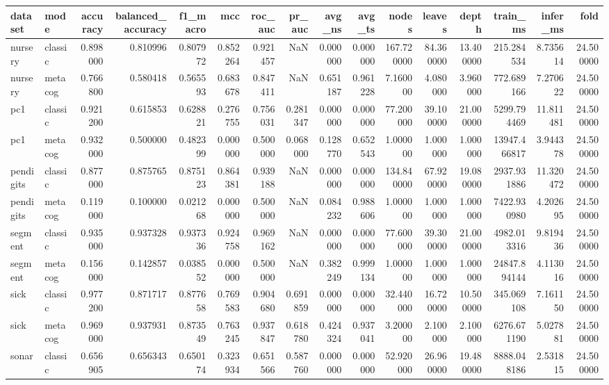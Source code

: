 \begin{tabular}{llrrrrrrrrrrrrrr}
\toprule
dataset & mode & accuracy & balanced_accuracy & f1_macro & mcc & roc_auc & pr_auc & avg_ns & avg_ts & nodes & leaves & depth & train_ms & infer_ms & fold \\
\midrule
nursery & classic & 0.898000 & 0.810996 & 0.807972 & 0.852264 & 0.921457 & NaN & 0.000000 & 0.000000 & 167.720000 & 84.360000 & 13.400000 & 215.284534 & 8.735614 & 24.500000 \\
nursery & metacog & 0.766800 & 0.580418 & 0.565593 & 0.683678 & 0.847411 & NaN & 0.651187 & 0.961228 & 7.160000 & 4.080000 & 3.960000 & 772.689166 & 7.270622 & 24.500000 \\
pc1 & classic & 0.921200 & 0.615853 & 0.628821 & 0.276755 & 0.756031 & 0.281347 & 0.000000 & 0.000000 & 77.200000 & 39.100000 & 21.000000 & 5299.794469 & 11.811481 & 24.500000 \\
pc1 & metacog & 0.932000 & 0.500000 & 0.482399 & 0.000000 & 0.500000 & 0.068000 & 0.128770 & 0.652543 & 1.000000 & 1.000000 & 1.000000 & 13947.466817 & 3.944378 & 24.500000 \\
pendigits & classic & 0.877000 & 0.875765 & 0.875123 & 0.864381 & 0.939188 & NaN & 0.000000 & 0.000000 & 134.840000 & 67.920000 & 19.080000 & 2937.931886 & 11.320472 & 24.500000 \\
pendigits & metacog & 0.119000 & 0.100000 & 0.021268 & 0.000000 & 0.500000 & NaN & 0.084232 & 0.988606 & 1.000000 & 1.000000 & 1.000000 & 7422.930980 & 4.202695 & 24.500000 \\
segment & classic & 0.935000 & 0.937328 & 0.937336 & 0.924758 & 0.969162 & NaN & 0.000000 & 0.000000 & 77.600000 & 39.300000 & 21.000000 & 4982.013316 & 9.819436 & 24.500000 \\
segment & metacog & 0.156000 & 0.142857 & 0.038552 & 0.000000 & 0.500000 & NaN & 0.382249 & 0.999134 & 1.000000 & 1.000000 & 1.000000 & 24847.894144 & 4.113016 & 24.500000 \\
sick & classic & 0.977200 & 0.871717 & 0.877658 & 0.769583 & 0.904680 & 0.691859 & 0.000000 & 0.000000 & 32.440000 & 16.720000 & 10.500000 & 345.069108 & 7.161150 & 24.500000 \\
sick & metacog & 0.969000 & 0.937931 & 0.873549 & 0.763245 & 0.937847 & 0.618780 & 0.424324 & 0.937041 & 3.200000 & 2.100000 & 2.100000 & 6276.671190 & 5.027881 & 24.500000 \\
sonar & classic & 0.656905 & 0.656343 & 0.650174 & 0.323934 & 0.651566 & 0.587760 & 0.000000 & 0.000000 & 52.920000 & 26.960000 & 19.480000 & 8888.048186 & 2.531815 & 24.500000 \\

\end{tabular}
